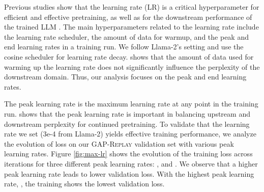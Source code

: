\documentclass{article}
\newcommand{\llama}{\textnormal{Llama}}
\begin{document}
Previous studies show that the learning rate (LR) is a critical hyperparameter for efficient and effective pretraining, as well as for the downstream performance of the trained LLM \citep{wu2019demystifying,jin2023rethinking,gupta2023continual}. The main hyperparameters related to the learning rate include the learning rate scheduler, the amount of data for warmup, and the peak and end learning rates in a training run. We follow \llama-2's setting and use the cosine scheduler for learning rate decay. \citet{gupta2023continual} shows that the amount of data used for warming up the learning rate does not significantly influence the perplexity of the downstream domain. Thus, our analysis focuses on the peak and end learning rates. 

The peak learning rate is the maximum learning rate at any point in the training run. \citet{gupta2023continual} shows that the peak learning rate is important in balancing upstream and downstream perplexity for continued pretraining. To validate that the learning rate we set (3e-4 from \llama-2) yields effective training performance, we analyze the evolution of loss on our \textsc{GAP-Replay} validation set with various peak learning rates. Figure \ref{fig:max-lr} shows the evolution of the training loss across iterations for three different peak learning rates: ,  and . We observe that a higher peak learning rate leads to lower validation loss. With the highest peak learning rate, , the training shows the lowest validation loss.

\begin{table}[t]
\centering
\small
{}
\caption{\textbf{Performance comparison of different end learning rates.} We analyze the impact of a higher learning rate on downstream medical benchmarks at the end of the epoch. We use the \llama-2-7B model, further pre-trained on the \textsc{GAP-replay} data mixture (with the two minimum learning rate settings), and fine-tuned on individual medical training sets. The token with the maximum log probability (Top-Token) is selected as the answer option for inference. Note that for MMLU-Medical, we use the model finetuned on MedMCQA since both have 4 options.}
\label{tab:learning-rate}
\vspace{-5mm}
\end{table}
\end{document}
